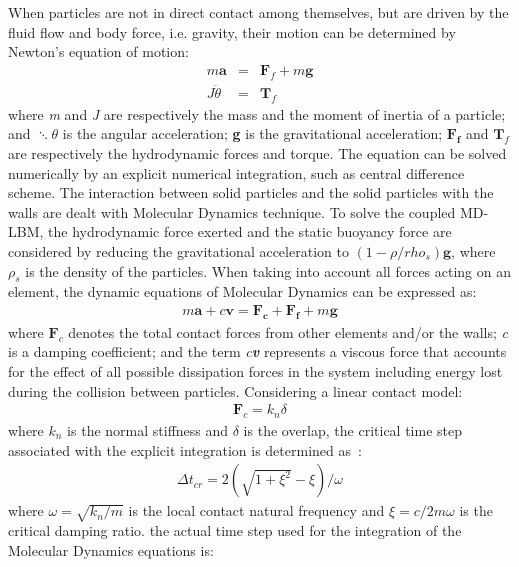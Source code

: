 When particles are not in direct contact among themselves, but are driven by the fluid flow and body force, i.e. gravity, their motion can be determined by Newton's equation of motion:
\begin{align}
\mathit{m}\mathbf{ a} & = & \mathbf{F}_{f} + \mathit{m }\mathbf{g} \\
\mathit{J } \ddot{\theta} & = &  \mathbf{T}_{f}
\end{align}
where \textit{m} and \textit{J} are respectively the mass and the moment of inertia of a particle; and $\ddots{\theta}$ is the angular acceleration; \textbf{g} is the gravitational acceleration; $\mathbf{F_f}$ and $\mathbf{T}_{f}$ are respectively the hydrodynamic forces and torque. The equation can be solved numerically by an explicit numerical integration, such as central difference scheme. The interaction between solid particles and the solid particles with the walls are dealt with Molecular Dynamics technique. To solve the coupled MD-LBM, the hydrodynamic force exerted and the static buoyancy force are considered by reducing the gravitational acceleration to $(1- \rho/rho_{s})\mathbf{g}$, where $\rho_{s}$ is the density of the particles. When taking into account all forces acting on an element, the dynamic equations of Molecular Dynamics can be expressed as:
\begin{align}
\label{eq:mde}
\mathit{m}\mathbf{a} +\mathit{c}\mathbf{v} = \mathbf{F_c} + \mathbf{F_f} +\mathit{m}\mathbf{g}
\end{align} 
where $\mathbf{F}_{c}$ denotes the total contact forces from other elements and/or the walls; \textit{c} is a damping coefficient; and the term \textit{c\textbf{v}} represents a viscous force that accounts for the effect of all possible dissipation forces in the system including energy lost during the collision between particles. Considering a linear contact model:
\begin{align}
\mathbf{F}_{c}=\mathit{k}_{\mathit{n}} \delta
\end{align}
where $\mathit{k}_{\mathit{n}}$ is the normal stiffness and $\delta$ is the overlap, the critical time step associated with the explicit integration is determined as~\citep{He1997}:
\begin{align}
\Delta t_{\mathit{cr}}= 2(\sqrt{1 + \xi^{2}}-\xi) / \omega
\end{align}
where $\omega = \sqrt{\mathit{k}_{\mathit{n}}/\mathit{m}}$ is the local contact natural frequency and $\xi = \mathit{c}/2\mathit{m}\omega$ is the critical damping ratio. the actual time step used for the integration of the Molecular Dynamics equations is:
